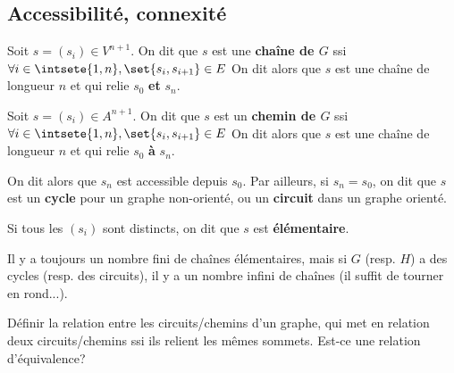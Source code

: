 \documentclass{scrartcl}
\begin{document}
		\subsection{Accessibilité, connexité}
			
			 Soit $s = (s_i)\in V^{n+1}$. 
			On dit que $s$ est une \textbf{chaîne de $G$} ssi
			$\forall i \in \intsete{1,n}, \set{s_i, s_{i+1}} \in E$
			On dit alors que $s$ est une chaîne de longueur $n$ et qui relie $s_0$ \textbf{et} $s_n$.

			 Soit $s = (s_i)\in A^{n+1}$. 
			On dit que $s$ est un \textbf{chemin de $G$} ssi
			$\forall i \in \intsete{1,n}, \set{s_i, s_{i+1}} \in E$	
			On dit alors que $s$ est une chaîne de longueur $n$ et qui relie $s_0$ \textbf{à} $s_n$.

			On dit alors que $s_n$ est accessible depuis $s_0$.
			Par ailleurs, si $s_n = s_0$, on dit que $s$ est un \textbf{cycle} pour un graphe non-orienté, 
			ou un \textbf{circuit} dans un graphe orienté.

			Si tous les $(s_i)$ sont distincts, on dit que $s$ est \textbf{élémentaire}. 

			\rem Il y a toujours un nombre fini de chaînes élémentaires, mais si $G$ (resp. $H$) a des cycles (resp. des circuits),
			il y a un nombre infini de chaînes (il suffit de tourner en rond...).

			\exo Définir la relation entre les circuits/chemins d'un graphe, 
			qui met en relation deux circuits/chemins ssi ils relient les mêmes sommets.
			Est-ce une relation d'équivalence?
\end{document}
